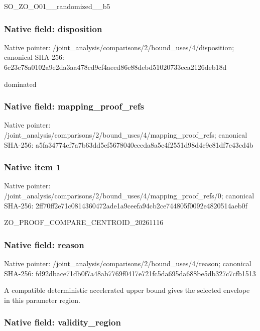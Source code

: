 \documentclass[10pt,a4paper]{article}
\begin{document}
SO\_ZO\_O01\_\_randomized\_\_b5


\subsubsection{Native field: disposition}


Native pointer: /joint\_analysis/comparis\allowbreak{}ons/2/bound\_uses/4/dispo\allowbreak{}sition; canonical SHA-256: 6c23c78a0102a9e2da3aa478\allowbreak{}cd9cf4aecd86c88debd51020\allowbreak{}733eca2126deb18d


dominated


\subsubsection{Native field: mapping\_proof\_refs}


Native pointer: /joint\_analysis/comparis\allowbreak{}ons/2/bound\_uses/4/mappi\allowbreak{}ng\_proof\_refs; canonical SHA-256: a5fa34774cf7a7b63dd5ef56\allowbreak{}78040eceda8a5c4f2551d98d\allowbreak{}4c9c81df7e43cd4b



\subsubsection{Native item 1}


Native pointer: /joint\_analysis/comparis\allowbreak{}ons/2/bound\_uses/4/mappi\allowbreak{}ng\_proof\_refs/0; canonical SHA-256: 2ff70ff2e71c0814360472ad\allowbreak{}e1a9ceefa94cb2ce744805f0\allowbreak{}092e4820514aeb0f


ZO\_PROOF\_COMPARE\_CENTROID\_20261116


\subsubsection{Native field: reason}


Native pointer: /joint\_analysis/comparis\allowbreak{}ons/2/bound\_uses/4/reaso\allowbreak{}n; canonical SHA-256: fd92dbace71db0f7a48ab776\allowbreak{}9f0417e721fc5da695da688b\allowbreak{}e5db327c7cfb1513


A compatible deterministic accelerated upper bound gives the selected envelope in this parameter region.


\subsubsection{Native field: validity\_region}
\end{document}
